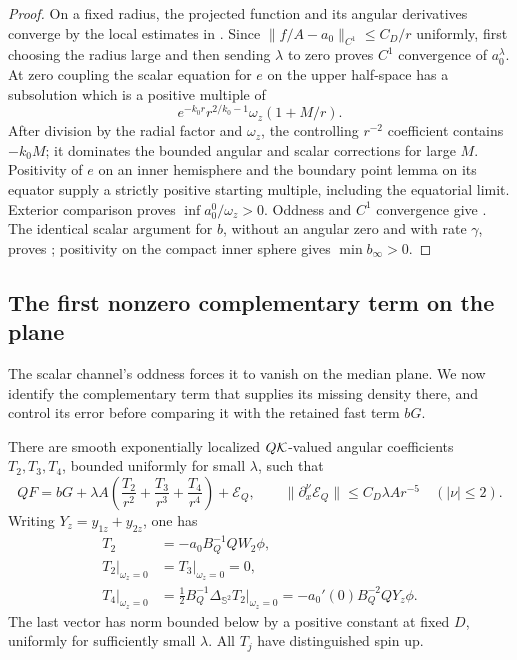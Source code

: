 \begin{proof}
On a fixed radius, the projected function and its angular derivatives
converge by the local estimates in .
Since \(\|f/A-a_0\|_{C^1}\leq C_D/r\) uniformly, first choosing
the radius large and then sending \(\lambda\) to zero proves
\(C^1\) convergence of \(a_0^\lambda\).
At zero coupling the scalar equation for \(e\) on the upper half-space
has a subsolution which is a positive multiple of
\[
 e^{-k_0r}r^{2/k_0-1}\omega_z(1+M/r).
 \]
After division by the radial factor and \(\omega_z\), the controlling
\(r^{-2}\) coefficient contains \(-k_0M\); it dominates the bounded
angular and scalar corrections for large \(M\).
Positivity of \(e\) on an inner hemisphere and the boundary point
lemma on its equator supply a strictly positive starting multiple,
including the equatorial limit.  Exterior comparison proves
\(\inf a_0^0/\omega_z>0\).  Oddness and \(C^1\) convergence give
.  The identical scalar argument for
\(b\), without an angular zero and with rate \(\gamma\), proves
; positivity on the compact inner
sphere gives \(\min b_\infty>0\).
\end{proof}

\subsection{The first nonzero complementary term on the plane}

The scalar channel's oddness forces it to vanish on the median plane.
We now identify the complementary term that supplies its missing
density there, and control its error before comparing it with the
retained fast term \(bG\).

\begin{lemma}
\label{lem:plane-coefficient}
There are smooth exponentially localized \(Q\mathcal K\)-valued angular
coefficients \(T_2,T_3,T_4\), bounded uniformly for small \(\lambda\),
such that
\begin{equation}
 QF=bG+\lambda A
       \left(\frac{T_2}{r^2}+\frac{T_3}{r^3}+\frac{T_4}{r^4}\right)
       +\mathcal E_Q,\qquad
 \|\partial_x^\nu\mathcal E_Q\|
       \leq C_D\lambda Ar^{-5}\quad(|\nu|\leq2).
 \label{eq:complementary-expansion}
\end{equation}
Writing \(Y_z=y_{1z}+y_{2z}\), one has
\begin{equation}
 \begin{split}
 T_2&=-a_0B_Q^{-1}QW_2\phi,\\
 T_2|_{\omega_z=0}&=T_3|_{\omega_z=0}=0,\\
 T_4|_{\omega_z=0}
   &=\frac12B_Q^{-1}\Delta_{\mathbb S^2}T_2|_{\omega_z=0}
     =-a_0'(0)B_Q^{-2}QY_z\phi .
 \end{split}
 \label{eq:equatorial-coefficient}
\end{equation}
The last vector has norm bounded below by a positive constant at
fixed \(D\), uniformly for sufficiently small \(\lambda\).
All \(T_j\) have distinguished spin up.
\end{lemma}

